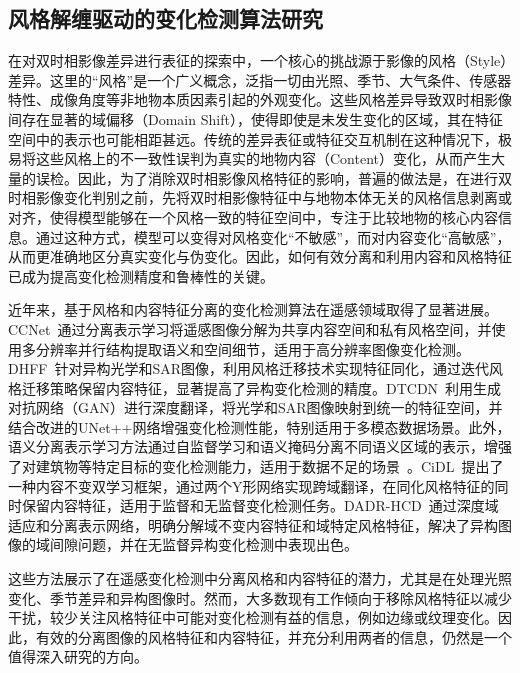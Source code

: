 \subsection{风格解缠驱动的变化检测算法研究}

在对双时相影像差异进行表征的探索中，一个核心的挑战源于影像的风格（Style）差异。这里的“风格”是一个广义概念，泛指一切由光照、季节、大气条件、传感器特性、成像角度等非地物本质因素引起的外观变化。这些风格差异导致双时相影像间存在显著的域偏移（Domain Shift），使得即使是未发生变化的区域，其在特征空间中的表示也可能相距甚远。传统的差异表征或特征交互机制在这种情况下，极易将这些风格上的不一致性误判为真实的地物内容（Content）变化，从而产生大量的误检。因此，为了消除双时相影像风格特征的影响，普遍的做法是，在进行双时相影像变化判别之前，先将双时相影像特征中与地物本体无关的风格信息剥离或对齐，使得模型能够在一个风格一致的特征空间中，专注于比较地物的核心内容信息。通过这种方式，模型可以变得对风格变化“不敏感”，而对内容变化“高敏感”，从而更准确地区分真实变化与伪变化。因此，如何有效分离和利用内容和风格特征已成为提高变化检测精度和鲁棒性的关键。

近年来，基于风格和内容特征分离的变化检测算法在遥感领域取得了显著进展。CCNet~\cite{cheng2024harmony}通过分离表示学习将遥感图像分解为共享内容空间和私有风格空间，并使用多分辨率并行结构提取语义和空间细节，适用于高分辨率图像变化检测。DHFF~\cite{jiang2020change}针对异构光学和SAR图像，利用风格迁移技术实现特征同化，通过迭代风格迁移策略保留内容特征，显著提高了异构变化检测的精度。DTCDN~\cite{li2021deep}利用生成对抗网络（GAN）进行深度翻译，将光学和SAR图像映射到统一的特征空间，并结合改进的UNet++网络增强变化检测性能，特别适用于多模态数据场景。此外，语义分离表示学习方法通过自监督学习和语义掩码分离不同语义区域的表示，增强了对建筑物等特定目标的变化检测能力，适用于数据不足的场景~\cite{chen2022semantic}。CiDL~\cite{Fang2022ContentInvariantDL}提出了一种内容不变双学习框架，通过两个Y形网络实现跨域翻译，在同化风格特征的同时保留内容特征，适用于监督和无监督变化检测任务。DADR-HCD~\cite{Dai2024DADRHCDAD}通过深度域适应和分离表示网络，明确分解域不变内容特征和域特定风格特征，解决了异构图像的域间隙问题，并在无监督异构变化检测中表现出色。

这些方法展示了在遥感变化检测中分离风格和内容特征的潜力，尤其是在处理光照变化、季节差异和异构图像时。然而，大多数现有工作倾向于移除风格特征以减少干扰，较少关注风格特征中可能对变化检测有益的信息，例如边缘或纹理变化。因此，有效的分离图像的风格特征和内容特征，并充分利用两者的信息，仍然是一个值得深入研究的方向。



